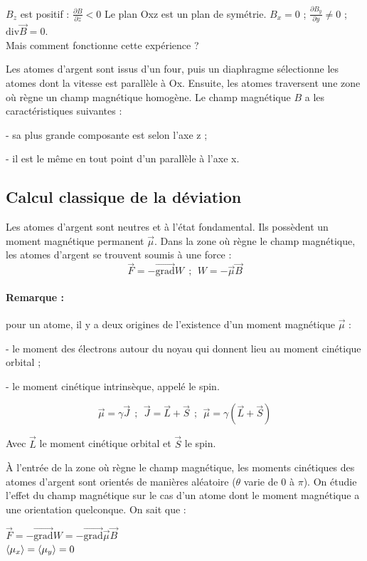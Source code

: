 \documentclass[12pt,a4paper,titlepage]{book}
\begin{document}
$B_z$ est positif : $\frac{\partial B}{\partial z} < 0$
Le plan Oxz est un plan de symétrie. $B_x = 0$ ; $\frac{\partial B_y}{\partial y} \neq 0$ ; $\text{div} \overrightarrow{B} = 0$.\\

Mais comment fonctionne cette expérience ?

Les atomes d'argent sont issus d'un four, puis un diaphragme sélectionne les atomes dont la vitesse est parallèle à Ox. Ensuite, les atomes traversent une zone où règne un champ magnétique homogène. Le champ magnétique $B$ a les caractéristiques suivantes :

- sa plus grande composante est selon l'axe z ;

- il est le même en tout point d'un parallèle à l'axe x.

\subsection{Calcul classique de la déviation}
Les atomes d'argent sont neutres et à l'état fondamental. Ils possèdent un moment magnétique permanent $\overrightarrow{\mu}$. Dans la zone où règne le champ magnétique, les atomes d'argent se trouvent soumis à une force :
\begin{equation*}
\overrightarrow{F} = -\overrightarrow{\text{grad}} W ~~;~~ W = - \overrightarrow{\mu} \overrightarrow{B}
\end{equation*}

\paragraph*{Remarque :}

pour un atome, il y a deux origines de l'existence d'un moment magnétique $\overrightarrow{\mu}$ :

- le moment des électrons autour du noyau qui donnent lieu au moment cinétique orbital ;

- le moment cinétique intrinsèque, appelé le spin.

\begin{equation*}
\overrightarrow{\mu} = \gamma \overrightarrow{J} ~~;~~ \overrightarrow{J} = \overrightarrow{L} + \overrightarrow{S} ~~;~~ \overrightarrow{\mu} = \gamma (\overrightarrow{L} + \overrightarrow{S})
\end{equation*}

Avec $\overrightarrow{L}$ le moment cinétique orbital et $\overrightarrow{S}$ le spin.

À l'entrée de la zone où règne le champ magnétique, les moments cinétiques des atomes d'argent sont orientés de manières aléatoire ($\theta$ varie de 0 à $\pi$). On étudie l'effet du champ magnétique sur le cas d'un atome dont le moment magnétique a une orientation quelconque. On sait que :
\begin{center}
$\overrightarrow{F} = - \overrightarrow{\text{grad}} W = - \overrightarrow{\text{grad}} \overrightarrow{\mu} \overrightarrow{B}$\\
$\braket{\mu_x} = \braket{\mu_y} = 0$
\end{center}
\end{document}
